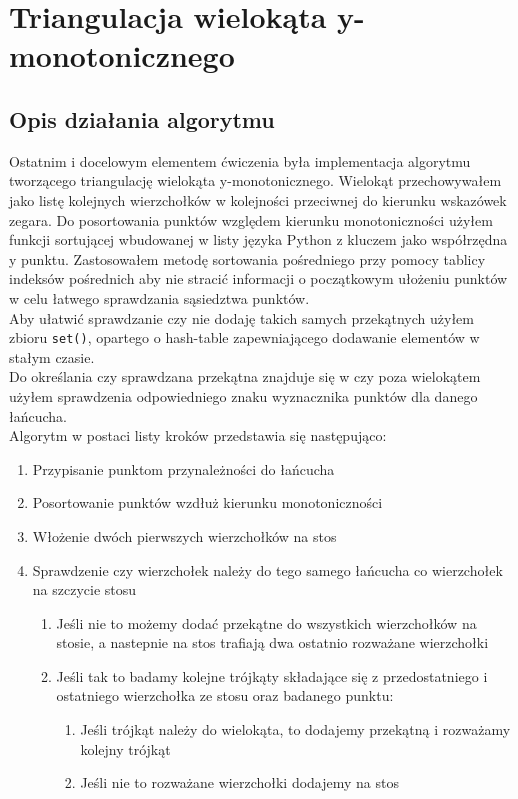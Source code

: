 \documentclass[a4paper]{article}
\begin{document}
\section{Triangulacja wielokąta y-monotonicznego}
    \subsection{Opis działania algorytmu}
    Ostatnim i docelowym elementem ćwiczenia była implementacja algorytmu tworzącego triangulację wielokąta
    y-monotonicznego. Wielokąt przechowywałem jako listę kolejnych wierzchołków w kolejności przeciwnej
    do kierunku wskazówek zegara. Do posortowania punktów względem kierunku monotoniczności użyłem funkcji 
    sortującej wbudowanej w listy języka Python z kluczem jako współrzędna y punktu. Zastosowałem metodę
    sortowania pośredniego przy pomocy tablicy indeksów pośrednich aby nie stracić informacji o początkowym 
    ułożeniu punktów w celu łatwego sprawdzania sąsiedztwa punktów.\\
    Aby ułatwić sprawdzanie czy nie dodaję takich samych przekątnych użyłem zbioru \verb|set()|, opartego o 
    hash-table zapewniającego dodawanie elementów w stałym czasie.\\
    Do określania czy sprawdzana przekątna znajduje się w czy poza wielokątem użyłem sprawdzenia odpowiedniego znaku
    wyznacznika punktów dla danego łańcucha.\\
    Algorytm w postaci listy kroków przedstawia się następująco:
    \begin{enumerate}
        \item Przypisanie punktom przynależności do łańcucha
        \item Posortowanie punktów wzdłuż kierunku monotoniczności
        \item Włożenie dwóch pierwszych wierzchołków na stos
        \item Sprawdzenie czy wierzchołek należy do tego samego łańcucha co wierzchołek na 
        szczycie stosu
        \begin{enumerate}
            \item Jeśli nie to możemy dodać przekątne do wszystkich wierzchołków na stosie, a nastepnie
            na stos trafiają dwa ostatnio rozważane wierzchołki
            \item Jeśli tak to badamy kolejne trójkąty składające się z przedostatniego i ostatniego wierzchołka
            ze stosu oraz badanego punktu:
            \begin{enumerate}
                \item Jeśli trójkąt należy do wielokąta, to dodajemy przekątną i rozważamy kolejny trójkąt
                \item Jeśli nie to rozważane wierzchołki dodajemy na stos
            \end{enumerate}
        \end{enumerate}
    \end{enumerate}
\end{document}
